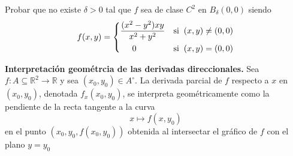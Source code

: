 \begin{tarea}Probar que  no existe $\delta>0$ tal que $f$  sea de clase $C^{2}$ en  $B_{\delta}(0,0)$  siendo
  $$f(x,y)=\begin{dcases}
           \frac{ (x^{2}-y^{2}) xy }{ x^{2}+y^{2}} & \text{si}\;\; (x,y)\neq(0,0) \\
           \hspace{0.5cm}0 & \text{si}\;\; (x,y) = (0,0)
          \end{dcases}$$
\end{tarea}

\begin{obs} \textbf{Interpretaci\'on geom\'etrcia de las derivadas direccionales.}  Sea $f:A \subseteq \mathbb{R}^2 \to \mathbb{R}$  y sea $(x_0,y_0) \in A^{\circ}$.  
La derivada parcial de $f$ respecto a $x$ en $(x_0,y_0)$, denotada $\displaystyle f_x(x_0,y_0)$, 
se interpreta geométricamente como la pendiente de la recta tangente a la curva
\[
x \mapsto f(x, y_0)
\]
en el punto $(x_0, y_0, f(x_0,y_0))$ obtenida al intersectar el gráfico de $f$ con el plano $y = y_0$   

\end{obs}

